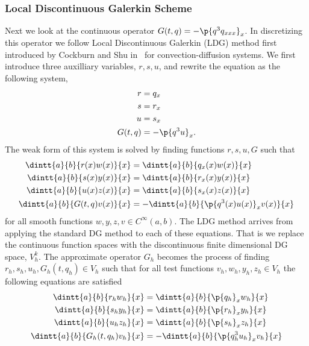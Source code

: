 
\subsubsection{Local Discontinuous Galerkin Scheme}\label{ssec:ldg}
Next we look at the continuous operator \(G(t, q) = -\p{q^3 q_{xxx}}_x\).
In discretizing this operator we follow Local Discontinuous Galerkin (LDG) method
first introduced by Cockburn and Shu in~\cite{article:Cockburn1998LDG} for
convection-diffusion systems.
We first introduce three auxilliary variables, \(r, s, u\), and rewrite the equation
as the following system,
\begin{align}
  r &= q_x \\
  s &= r_x \\
  u &= s_x \\
  G(t, q) &= -\p{q^3 u}_x.
\end{align}
The weak form of this system is solved by finding functions \(r, s, u, G\) such that
\begin{align}
  \dintt{a}{b}{r(x) w(x)}{x} &= \dintt{a}{b}{q_x(x) w(x)}{x} \\
  \dintt{a}{b}{s(x) y(x)}{x} &= \dintt{a}{b}{r_x(x) y(x)}{x} \\
  \dintt{a}{b}{u(x) z(x)}{x} &= \dintt{a}{b}{s_x(x) z(x)}{x} \\
  \dintt{a}{b}{G(t, q) v(x)}{x} &= -\dintt{a}{b}{\p{q^3(x) u(x)}_x v(x)}{x}
\end{align}
for all smooth functions \(w, y, z, v \in C^{\infty}(a, b)\).
The LDG method arrives from applying the standard DG method to each of these
equations.
That is we replace the continuous function spaces with the
discontinuous finite dimensional DG space, \(V_h^k\).
The approximate operator \(G_h\) becomes the process of finding
\(r_h, s_h, u_h, G_h(t, q_h) \in V_h\) such that for all test functions
\(v_h, w_h, y_h, z_h \in V_h\) the following equations are
satisfied
\begin{align}
  \dintt{a}{b}{r_h w_h}{x} &= \dintt{a}{b}{\p{q_h}_x w_h}{x} \\
  \dintt{a}{b}{s_h y_h}{x} &= \dintt{a}{b}{\p{r_h}_x y_h}{x} \\
  \dintt{a}{b}{u_h z_h}{x} &= \dintt{a}{b}{\p{s_h}_x z_h}{x} \\
  \dintt{a}{b}{G_h(t, q_h) v_h}{x} &= -\dintt{a}{b}{\p{q_h^3 u_h}_x v_h}{x}
\end{align}
